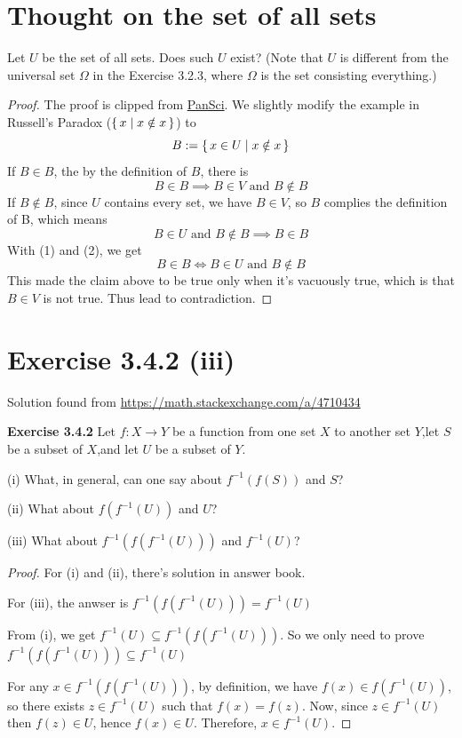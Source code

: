 \documentclass{article}
\begin{document}
\section{Thought on the set of all sets}
Let $U$ be the set of all sets. Does such $U$ exist?
(Note that $U$ is different from the universal set $\Omega$ in the Exercise 3.2.3,
where $\Omega$ is the set consisting everything.)
\begin{proof}
    The proof is clipped from \href{https://pansci.asia/archives/75290}{PanSci}.
    We slightly modify the example in Russell’s Paradox ($\set{x|x\notin x}$) to
    \[B:=\set{x\in U|x\notin x}\]
    If $B\in B$, the by the definition of $B$, there is
    \[B\in B\implies B\in V \text{ and }B\notin B\tag{1}\]
    If $B\notin B$, since $U$ contains every set, we have $B\in V$,
    so $B$ complies the definition of B, which means
    \[B\in U\text{ and }B\notin B\implies B\in B\tag{2}\]
    With (1) and (2), we get
    \[B\in B\iff B\in U\text{ and }B\notin B\]
    This made the claim above to be true only when it's vacuously true,
    which is that $B\in V$ is not true. Thus lead to contradiction.
\end{proof}

\section{Exercise 3.4.2 (iii)}
Solution found from \url{https://math.stackexchange.com/a/4710434}

\textbf{Exercise 3.4.2} Let $f : X \to Y$ be a function from one set $X$ to another set $Y$,let $S$ be a subset of
$X$,and let $U$ be a subset of $Y$.

(i) What, in general, can one say about $f^{-1}( f (S))$ and $S$?

(ii) What about $f( f^{-1}(U))$ and $U$?

(iii) What about $f^{-1}( f ( f^{-1}(U)))$ and $f^{-1}(U)$?

\begin{proof}
    For (i) and (ii), there's solution in answer book.

    For (iii), the anwser is $f^{-1}( f ( f^{-1}(U)))=f^{-1}(U)$

    From (i), we get $f^{-1}(U)\subseteq f^{-1}( f ( f^{-1}(U)))$. So we only need to prove
    $f^{-1}( f ( f^{-1}(U)))\subseteq f^{-1}(U)$

    For any $x\in f^{-1}( f ( f^{-1}(U)))$, by definition,
    we have $f(x)\in f ( f^{-1}(U))$,
    so there exists $z\in f^{-1}(U)$ such that $f(x)=f(z)$.
    Now, since $z\in f^{-1}(U)$ then $f(z)\in U$,
    hence $f(x)\in U$. Therefore, $x\in f^{-1}(U)$.
\end{proof}
\end{document}
